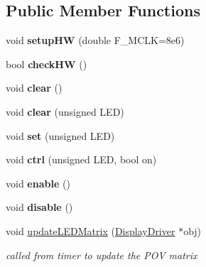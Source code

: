 \subsection*{Public Member Functions}
\begin{DoxyCompactItemize}
\item 
\mbox{\label{class_cribbage_1_1_display_driver_ac9217d6e9244d5a8655e34b5919266fa}} 
void {\bfseries setup\+HW} (double F\+\_\+\+M\+C\+LK=8e6)
\item 
\mbox{\label{class_cribbage_1_1_display_driver_a916e691820f3dc18cb536983be2d2167}} 
bool {\bfseries check\+HW} ()
\item 
\mbox{\label{class_cribbage_1_1_display_driver_a5b90d7c871e89553f92d7c53cf986684}} 
void {\bfseries clear} ()
\item 
\mbox{\label{class_cribbage_1_1_display_driver_a15b35b5e8a79eff7807537f5eb93c361}} 
void {\bfseries clear} (unsigned L\+ED)
\item 
\mbox{\label{class_cribbage_1_1_display_driver_ac4599507901396eefe0f3b1e3f5ecf4f}} 
void {\bfseries set} (unsigned L\+ED)
\item 
\mbox{\label{class_cribbage_1_1_display_driver_ae973c526c59eac9b4993e706690df865}} 
void {\bfseries ctrl} (unsigned L\+ED, bool on)
\item 
\mbox{\label{class_cribbage_1_1_display_driver_a72c8a60aa48465d4393e0e18a7db83bf}} 
void {\bfseries enable} ()
\item 
\mbox{\label{class_cribbage_1_1_display_driver_afb8bdd33502ff7fbbcd9776f57ec4e53}} 
void {\bfseries disable} ()
\item 
\mbox{\label{class_cribbage_1_1_display_driver_a18ce27a00334e2d2bf4d1bababd60c39}} 
void \hyperlink{class_cribbage_1_1_display_driver_a18ce27a00334e2d2bf4d1bababd60c39}{update\+L\+E\+D\+Matrix} (\hyperlink{class_cribbage_1_1_display_driver}{Display\+Driver} $\ast$obj)
\begin{DoxyCompactList}\small\item\em called from timer to update the P\+OV matrix \end{DoxyCompactList}\end{DoxyCompactItemize}



